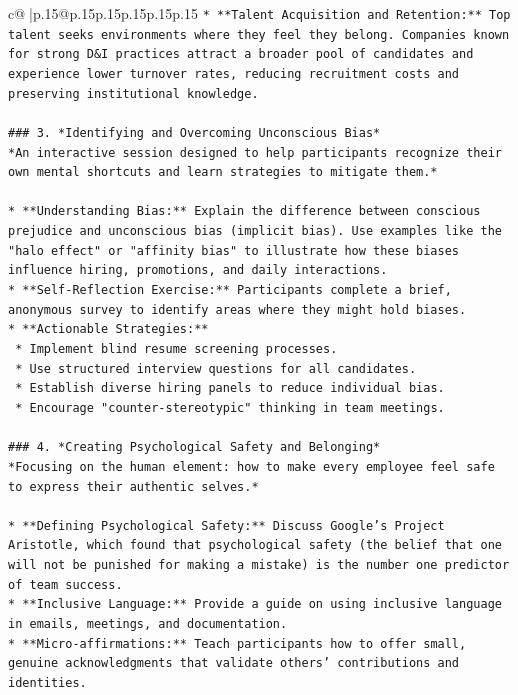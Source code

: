 \documentclass{article}
\begin{document}
{\begin{supertabular}{c@{$\;$}|p{.15\linewidth}@{}p{.15\linewidth}p{.15\linewidth}p{.15\linewidth}p{.15\linewidth}p{.15\linewidth}}
{{{\texttt{*   **Talent Acquisition and Retention:** Top talent seeks environments where they feel they belong. Companies known for strong D\&I practices attract a broader pool of candidates and experience lower turnover rates, reducing recruitment costs and preserving institutional knowledge.} \\
\\ 
\texttt{\#\#\# 3. *Identifying and Overcoming Unconscious Bias*} \\
\texttt{*An interactive session designed to help participants recognize their own mental shortcuts and learn strategies to mitigate them.*} \\
\\ 
\texttt{*   **Understanding Bias:** Explain the difference between conscious prejudice and unconscious bias (implicit bias). Use examples like the "halo effect" or "affinity bias" to illustrate how these biases influence hiring, promotions, and daily interactions.} \\
\texttt{*   **Self{-}Reflection Exercise:** Participants complete a brief, anonymous survey to identify areas where they might hold biases.} \\
\texttt{*   **Actionable Strategies:**} \\
\texttt{    *   Implement blind resume screening processes.} \\
\texttt{    *   Use structured interview questions for all candidates.} \\
\texttt{    *   Establish diverse hiring panels to reduce individual bias.} \\
\texttt{    *   Encourage "counter{-}stereotypic" thinking in team meetings.} \\
\\ 
\texttt{\#\#\# 4. *Creating Psychological Safety and Belonging*} \\
\texttt{*Focusing on the human element: how to make every employee feel safe to express their authentic selves.*} \\
\\ 
\texttt{*   **Defining Psychological Safety:** Discuss Google's Project Aristotle, which found that psychological safety (the belief that one will not be punished for making a mistake) is the number one predictor of team success.} \\
\texttt{*   **Inclusive Language:** Provide a guide on using inclusive language in emails, meetings, and documentation.} \\
\texttt{*   **Micro{-}affirmations:** Teach participants how to offer small, genuine acknowledgments that validate others' contributions and identities.} \\
}}}
\end{supertabular}}
\end{document}
